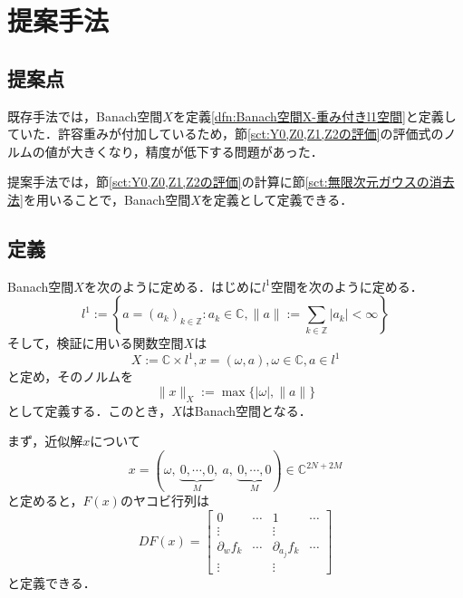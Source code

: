 
\chapter{提案手法}
\label{cpt:提案手法}

\section{提案点}

既存手法では，Banach空間$X$を定義\ref{dfn:Banach空間X-重み付きl1空間}と定義していた．許容重みが付加しているため，節\ref{sct:Y0,Z0,Z1,Z2の評価}の評価式のノルムの値が大きくなり，精度が低下する問題があった．

提案手法では，節\ref{sct:Y0,Z0,Z1,Z2の評価}の計算に節\ref{sct:無限次元ガウスの消去法}を用いることで，Banach空間$X$を定義として定義できる．

\section{定義}

\begin{dfn}[許容重みなしBanach空間$X$]
  \label{dfn:Banach-l1}
  Banach空間$X$を次のように定める．はじめに$l^1$空間を次のように定める．
  \begin{equation}
    l^1 := \left\{ a=(a_k)_{k\in \mathbb{Z}} : a_k \in \mathbb{C}, \|a\| := \sum_{k \in \mathbb{Z}} |a_k| < \infty \right\}
  \end{equation}
  そして，検証に用いる関数空間$X$は
  \begin{equation}
    X:= \mathbb{C} \times l^1, x = (\omega, a), \omega \in \mathbb{C}, a \in l^1
  \end{equation}
  と定め，そのノルムを
  \begin{equation}
    \| x \|_X := \max \{ |\omega| , \|a\| \}
  \end{equation}
  として定義する．このとき，$X$はBanach空間となる．
\end{dfn}

\begin{dfn}[拡張したヤコビ行列$DF(x)$]
  \label{dfn:拡張したヤコビ行列}
  まず，近似解$x$について
  \begin{equation}
    x = (\omega,\ \underbrace{0,\cdots,0}_{M},\ a,\ \underbrace{0,\cdots,0}_{M}) \in \mathbb{C}^{2N+2M}
  \end{equation}
  と定めると，$F(x)$のヤコビ行列は
  \begin{equation}
    DF(x) = \left[
      \begin{array}{c|ccc}
        0 & \cdots & 1 & \cdots \\ \hline
        \vdots & & \vdots &  \\
        \partial_w f_k & \cdots & \partial_{a_j}f_k & \cdots \\
        \vdots & & \vdots &
      \end{array}
    \right] %
  \end{equation}
  と定義できる．
\end{dfn}

